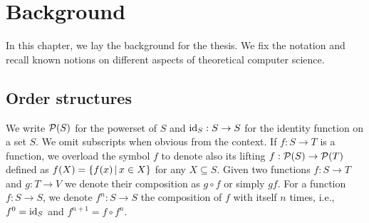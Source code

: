
\chapter{Background}\label{ch:background}

In this chapter, we lay the background for the thesis. We fix the notation and recall known notions on different aspects of theoretical computer science.

\section{Order structures}\label{sec:bg:posets}
We write $\mathcal{P}(S)$ for the powerset of $S$ and $\text{id}_S: S \rightarrow S$ for the identity function on a set $S$. We omit subscripts when obvious from the context. If $f : S \rightarrow T$ is a function, we overload the symbol $f$ to denote also its lifting $f: \mathcal{P}(S) \rightarrow \mathcal{P}(T)$ defined as $f(X) = \{ f(x) \,\vert\, x \in X \}$ for any $X \subseteq S$.
Given two functions $f: S \rightarrow T$ and $g: T \rightarrow V$ we denote their composition as $g \circ f$ or simply $gf$.
For a function $f : S \rightarrow S$, we denote $f^n: S \rightarrow S$ the composition of $f$ with itself $n$ times, i.e., $f^{0} = \text{id}_S$ and $f^{n+1} = f \circ f^{n}$.

